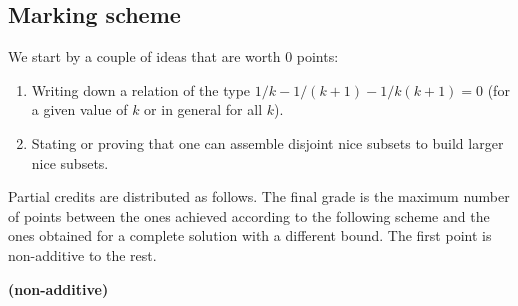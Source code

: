 \subsection{Marking scheme}

We start by a couple of ideas that are worth 0 points:
\begin{enumerate}
    \item Writing down a relation of the type $1/k - 1/(k+1) - 1/k(k+1) = 0$ (for a given value of $k$ or in general for all $k$).
    \item Stating or proving that one can assemble disjoint nice subsets to build larger nice subsets.
\end{enumerate}
Partial credits are distributed as follows. The final grade is the maximum number of points between the ones achieved according to the following scheme and the ones obtained for a complete solution with a different bound. The first point is non-additive to the rest.
\begin{enumerate}
         \textbf{(non-additive)}
\end{enumerate}

